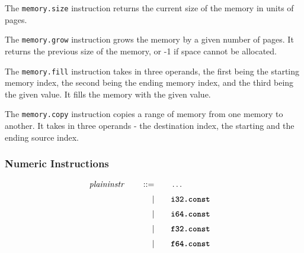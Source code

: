 The \texttt{memory.size} instruction returns the current size of the memory in units of pages. \vspace{1em}

The \texttt{memory.grow} instruction grows the memory by a given number of pages. It returns the previous size of the memory, or -1 if space cannot be allocated. \vspace{1em}

The \texttt{memory.fill} instruction takes in three operands, the first being the starting memory index, the second being the ending memory index, and the third being the given value. It fills the memory with the given value. \vspace{1em}

The \texttt{memory.copy} instruction copies a range of memory from one memory to another. It takes in three operands - the destination index, the starting and the ending source index. \vspace{1em}

\subsubsection{Numeric Instructions}
\begin{alignat*}{9}
    && \textit{plaininstr}\ &&\quad ::= &\quad && \dots \quad &&  \\[1mm]
  &&       &&\quad | &\quad && \textbf{\texttt{i32.const}} \quad &&  \\[1mm]
  &&       &&\quad | &\quad && \textbf{\texttt{i64.const}} \quad &&  \\[1mm]
  &&       &&\quad | &\quad && \textbf{\texttt{f32.const}} \quad &&  \\[1mm]
  &&       &&\quad | &\quad && \textbf{\texttt{f64.const}} \quad &&  \\[1mm]
\end{alignat*}

